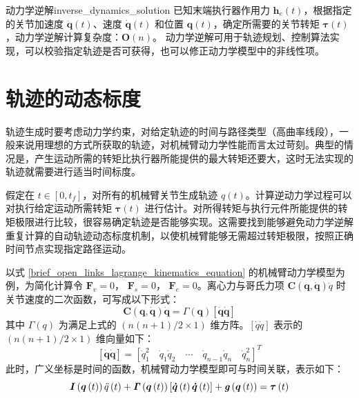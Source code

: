 \documentclass[cn,11pt,chinese,blue,bibstyle=ieeetr]{elegantbook}
\begin{document}
\begin{definition}{动力学逆解}{inverse_dynamics_solution}
已知末端执行器作用力 $\bm{h}_e(t)$，根据指定的关节加速度 $\bm{\ddot{q}}(t)$、速度 $\bm{\dot{q}}(t)$ 和位置 $\bm{q}(t)$，确定所需要的关节转矩 $\bm{\tau}(t)$，动力学逆解计算复杂度：$\bm{O}(n)$。
动力学逆解可用于轨迹规划、控制算法实现，可以校验指定轨迹是否可获得，也可以修正动力学模型中的非线性项。
\end{definition}


\section{轨迹的动态标度}

轨迹生成时要考虑动力学约束，对给定轨迹的时间与路径类型（高曲率线段），一般来说用理想的方式所获取的轨迹，对机械臂动力学性能而言太过苛刻。典型的情况是，产生运动所需的转矩比执行器所能提供的最大转矩还要大，这时无法实现的轨迹就需要进行适当时间标度。

假定在 $t \in [0, t_f]$，对所有的机械臂关节生成轨迹 $q(t)$。计算逆动力学过程可以对执行给定运动所需转矩 $\bm{\tau}(t)$ 进行估计。对所得转矩与执行元件所能提供的转矩极限进行比较，很容易确定轨迹是否能够实现。这需要找到能够避免动力学逆解重复计算的自动轨迹动态标度机制，以使机械臂能够无需超过转矩极限，按照正确时间节点实现指定路径运动。

以式 \ref{brief_open_links_lagrange_kinematics_equation} 的机械臂动力学模型为例，为简化计算令 $\bm{F}_v=0$， $\bm{F}_s=0$， $\bm{F}_e=0$。离心力与哥氏力项 $\bm{C}(\bm{q},\bm{\dot{q}})\dot{q}$ 时关节速度的二次函数，可写成以下形式：
\begin{equation}
\bm{C\left(q,\dot{q}\right)\dot{q} = \mathit{\Gamma} \left(q\right)[\dot{q}\dot{q}]} \nonumber
\end{equation}
其中 $\mathit{\Gamma} \left(q\right)$ 为满足上式的 $\left(n\left(n+1\right)/2 \times 1\right)$ 维方阵。$[\dot{q}\dot{q}]$ 表示的 $\left(n\left(n+1\right)/2 \times 1\right)$ 维向量如下：
\begin{equation}
\left[\bm{\dot{q}\dot{q}}\right] = [\dot{q}_1^2 \quad \dot{q}_1\dot{q}_2 \quad \cdots \quad \dot{q}_{n-1}\dot{q}_n \quad \dot{q}_n^2]^T \nonumber
\end{equation}
此时，广义坐标是时间的函数，机械臂动力学模型即可与时间关联，表示如下：
\begin{equation}\label{dynamic_scaling_lagrange_kinematics_equation_1}
\bm{I}\left(\bm{q}\left(t\right)\right)\ddot{q}\left(t\right) + \bm{\mathit{\Gamma}}\left(\bm{q}\left(t\right)\right)\left[\bm{\dot{q}}\left(t\right)\bm{\dot{q}}\left(t\right)\right] + \textbf{\textit{g}}\left(\bm{q}\left(t\right)\right) = \bm{\tau}\left(t\right)
\end{equation}
\end{document}
